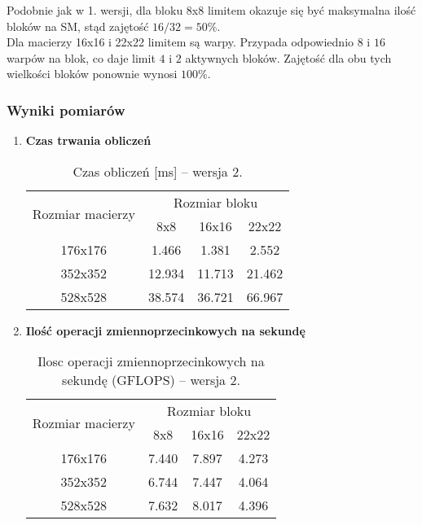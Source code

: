 Podobnie jak w 1. wersji, dla bloku 8x8 limitem okazuje się być maksymalna ilość bloków na SM, stąd zajętość $ 16 / 32 = 50\% $. \\
Dla macierzy 16x16 i 22x22 limitem są warpy. Przypada odpowiednio $ 8 $ i $ 16 $ warpów na blok, co daje limit $ 4 $ i $ 2 $ aktywnych bloków. Zajętość dla obu tych wielkości bloków ponownie wynosi $ 100\% $.

\subsubsection{Wyniki pomiarów}

\begin{enumerate}

\item \textbf{Czas trwania obliczeń} \newline

\begin{table}[H]
\centering
\begin{tabular}{|c|c|c|c|}
\hline
\multirow{2}{*}{Rozmiar macierzy} & \multicolumn{3}{c|}{Rozmiar bloku} \\ \cline{2-4}
& 8x8 & 16x16 & 22x22 \\ \hline
176x176 & 1.466 & 1.381 & 2.552 \\ \hline
352x352 & 12.934 & 11.713 & 21.462 \\ \hline
528x528 & 38.574 & 36.721 & 66.967 \\ \hline
\end{tabular}
\caption{Czas obliczeń [ms] -- wersja 2.}
\end{table}

\item \textbf{Ilość operacji zmiennoprzecinkowych na sekundę} \newline

\begin{table}[H]
\centering
\begin{tabular}{|c|c|c|c|}
\hline
\multirow{2}{*}{Rozmiar macierzy} & \multicolumn{3}{c|}{Rozmiar bloku} \\ \cline{2-4}
& 8x8 & 16x16 & 22x22 \\ \hline
176x176 & 7.440 & 7.897 & 4.273 \\ \hline
352x352 & 6.744 & 7.447 & 4.064 \\ \hline
528x528 & 7.632 & 8.017 & 4.396 \\ \hline
\end{tabular}
\caption{Ilosc operacji zmiennoprzecinkowych na sekundę (GFLOPS) -- wersja 2.}
\end{table}


\end{enumerate}
